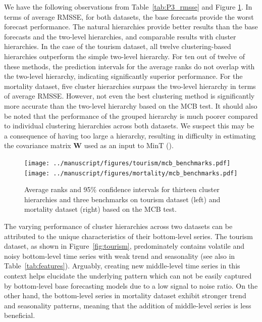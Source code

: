 \documentclass[a4paper,review,12pt,authoryear]{elsarticle}
\begin{document}
We have the following observations from Table~\ref{tab:P3_rmsse} and Figure \ref{fig:P3_mcb_benchmark}. In terms of average RMSSE, for both datasets, the base forecasts provide the worst forecast performance. The natural hierarchies provide better results than the base forecasts and the two-level hierarchies, and comparable results with cluster hierarchies. In the case of the tourism dataset, all twelve clustering-based hierarchies outperform the simple two-level hierarchy. For ten out of twelve of these methods, the prediction intervals for the average ranks do not overlap with the two-level hierarchy, indicating significantly superior performance.
For the mortality dataset, five cluster hierarchies surpass the two-level hierarchy in terms of average RMSSE. However,  not even the best clustering method is significantly more accurate than the two-level hierarchy based on the MCB test. {\color{purple}It should also be noted that the performance of the grouped hierarchy is much poorer compared to individual clustering hierarchies across both datasets. We suspect this may be a consequence of having too large a hierarchy, resulting in difficulty in estimating the covariance matrix $\boldsymbol{W}$ used as an input to MinT (\citealp{pritulargaStochasticCoherencyForecast2021}).}%

\begin{figure}[h!]
    \centering
    \vspace{0.1in}
    \texttt{[image: ../manuscript/figures/tourism/mcb\_benchmarks.pdf]}
    \texttt{[image: ../manuscript/figures/mortality/mcb\_benchmarks.pdf]}
    \caption{\label{fig:P3_mcb_benchmark}Average ranks and 95\% confidence intervals for {\color{purple} thirteen} cluster hierarchies and three benchmarks on tourism dataset (left) and mortality dataset (right) based on the MCB test.}
\end{figure}



The varying performance of cluster hierarchies across two datasets can be attributed to the unique characteristics of their bottom-level series.
The tourism dataset, as shown in Figure~\ref{fig:tourism}, predominately contains volatile and noisy bottom-level time series with weak trend and seasonality (see also in  Table~\ref{tab:features}). Arguably, creating new middle-level time series in this context helps elucidate the underlying pattern which can not be easily captured by bottom-level base forecasting models due to a low signal to noise ratio. 
On the other hand, the bottom-level series in mortality dataset exhibit stronger trend and seasonality patterns, meaning that the addition of middle-level series is less beneficial.\\
\end{document}
